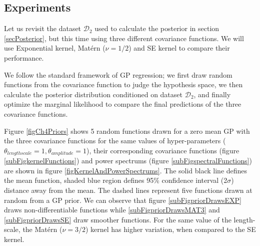 \subsection{Experiments}\label{subsecCH4Experiments}
\begin{mdframed}[hidealllines=true,backgroundcolor=lightgray!20]
Let us revisit the dataset $\mathcal{D}_{2}$ used to calculate the posterior in section \ref{secPosterior}, but this time using three different covariance functions. We will use Exponential kernel, Mat\'ern ($\nu=1/2$) and SE kernel to compare their performance. 

We follow the standard framework of GP regression; we first draw random functions from the covariance function to judge the hypothesis space, we then calculate the posterior distribution conditioned on dataset $\mathcal{D}_{2}$, and finally optimize the marginal likelihood to compare the final predictions of the three covariance functions. 

Figure \ref{figCh4Priors} shows 5 random functions drawn for a zero mean GP with the three covariance functions for the same values of hyper-parameters ($\theta_{lengthscale} = 1, \theta_{amplitude} = 1$), their corresponding covariance functions (figure \ref{subFigkernelFunctions}) and power spectrums (figure \ref{subFigspectralFunctions}) are shown in figure \ref{figKernelAndPowerSpectrums}. The solid black line defines the mean function, shaded blue region defines 95\% confidence interval (2$\sigma$) distance away from the mean. The dashed lines represent five functions drawn at random from a GP prior. We can observe that figure \ref{subFigpriorDrawsEXP} draws non-differentiable functions while \ref{subFigpriorDrawsMAT3} and \ref{subFigpriorDrawsSE} draw smoother functions. For the same value of the length-scale, the Mat\'ern ($\nu=3/2$) kernel has higher variation, when compared to the SE kernel.
\end{mdframed}

